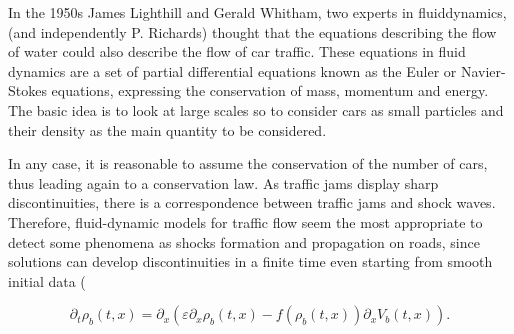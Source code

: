 In the 1950s James Lighthill and Gerald Whitham, two experts in fluiddynamics, (and independently P. Richards) thought that the equations describing the flow of water could also describe the flow of car traffic. These equations in fluid dynamics are a set of partial differential equations known as the Euler or Navier-Stokes equations, expressing the conservation of mass, momentum and energy. The basic idea is to look at large scales so to consider cars as small particles and their density as the main quantity to be considered.



In any case, it is reasonable to assume the conservation of the number of cars, thus leading again to a conservation law. As traffic jams display sharp discontinuities, there is a correspondence between traffic jams and shock waves. Therefore, fluid-dynamic models for traffic flow seem the most appropriate to detect some phenomena as shocks formation and propagation on roads, since solutions can develop discontinuities in a finite time even starting from smooth initial data (




\begin{equation} 
    \label{Drift-Diffusion-equation}
    \partial_t \rho_b (t,x) = \partial_x (\varepsilon \partial_x \rho_b (t,x) - f(\rho_b (t,x) ) \partial_x V_b (t,x)).
\end{equation}


